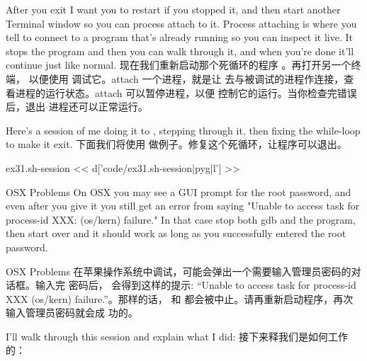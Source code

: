 \begin{enumerate}
After you exit  I want you to restart  if you
stopped it, and then start another Terminal window so you can process attach to
it.  Process attaching is where you tell  to connect to a program
that's already running so you can inspect it live.  It stops the program and
then you can walk through it, and when you're done it'll continue just like
normal.
现在我们重新启动那个死循环的程序 。再打开另一个终端，
以便使用  调试它。attach 一个进程，就是让 
去与被调试的进程作连接，查看进程的运行状态。attach 可以暂停进程，以便
控制它的运行。当你检查完错误后，退出  进程还可以正常运行。

Here's a session of me doing it to , stepping through it, then
fixing the while-loop to make it exit.
下面我们将使用  做例子。修复这个死循环，让程序可以退出。
\begin{code}{ex31.sh-session}
<< d['code/ex31.sh-session|pyg|l'] >>
\end{code}

\begin{aside}{OSX Problems}
On OSX you may see a GUI prompt for the root password, and even after you
give it you still get an error from  saying "Unable to access task for process-id XXX: (os/kern) failure."  In that case stop both gdb and the
 program, then start over and it should work as long as you
successfully entered the root password.
\end{aside}

\begin{aside}{OSX Problems}
在苹果操作系统中调试，可能会弹出一个需要输入管理员密码的对话框。输入完
密码后，  会得到这样的提示: “Unable to access task for
process-id XXX (os/kern) failure.”。那样的话， 和
 都会被中止。请再重新启动程序，再次输入管理员密码就会成
功的。
\end{aside}

I'll walk through this session and explain what I did:
接下来释我们是如何工作的：


\end{enumerate}
